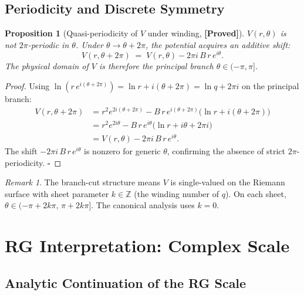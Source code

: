 \documentclass[12pt,a4paper]{article}
\newtheorem{proposition}[theorem]{Proposition}
\theoremstyle{definition}
\theoremstyle{remark}
\newtheorem{remark}[theorem]{Remark}
\newcommand{\ZZ}{\mathbb{Z}}
\newcommand{\PROVED}{\textbf{[Proved]}}
\begin{document}
\subsection{Periodicity and Discrete Symmetry}
\label{sec:cpe:periodicity}

\begin{proposition}[Quasi-periodicity of $V$ under winding, \PROVED]
\label{prop:cpe:period}
$V(r,\theta)$ is \emph{not} $2\pi$-periodic in $\theta$.  Under
$\theta \to \theta + 2\pi$, the potential acquires an additive shift:
\begin{equation}
  V(r, \theta + 2\pi) \;=\; V(r,\theta) - 2\pi i\,B\,r\,e^{i\theta}.
  \label{eq:cpe:quasiperiod}
\end{equation}
The physical domain of $V$ is therefore the principal branch $\theta \in (-\pi,\pi]$.
\end{proposition}

\begin{proof}
Using $\ln(r\,e^{i(\theta+2\pi)}) = \ln r + i(\theta + 2\pi) = \ln q + 2\pi i$
on the principal branch:
\begin{align*}
  V(r, \theta + 2\pi)
  &= r^2 e^{2i(\theta+2\pi)}
    - B\,r\,e^{i(\theta+2\pi)}\bigl(\ln r + i(\theta + 2\pi)\bigr) \\
  &= r^2 e^{2i\theta}
    - B\,r\,e^{i\theta}\bigl(\ln r + i\theta + 2\pi i\bigr) \\
  &= V(r,\theta) - 2\pi i\,B\,r\,e^{i\theta}.
\end{align*}
The shift $-2\pi i\,B\,r\,e^{i\theta}$ is nonzero for generic $\theta$,
confirming the absence of strict $2\pi$-periodicity. $\square$
\end{proof}

\begin{remark}
The branch-cut structure means $V$ is single-valued on the Riemann surface with
sheet parameter $k \in \ZZ$ (the winding number of $q$).  On each sheet,
$\theta \in (-\pi + 2k\pi,\, \pi + 2k\pi]$.  The canonical analysis uses $k = 0$.
\end{remark}

\section{RG Interpretation: Complex Scale}
\label{sec:cpe:RG}

\subsection{Analytic Continuation of the RG Scale}
\label{sec:cpe:RG_scale}
\end{document}
